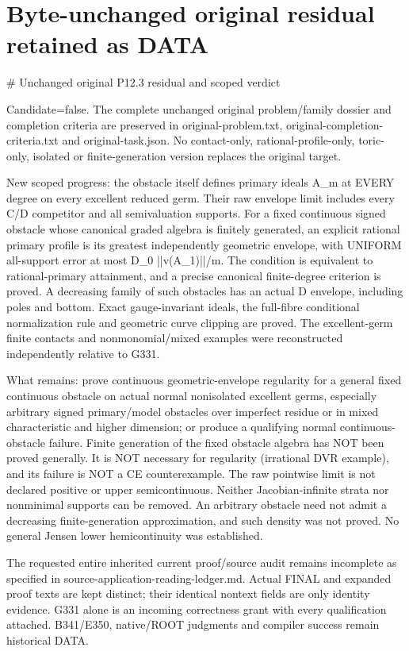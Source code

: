 \documentclass[11pt]{article}
\begin{document}
\section*{Byte-unchanged original residual retained as DATA}
\# Unchanged original P12.3 residual and scoped verdict

Candidate=false. The complete unchanged original problem/family dossier and completion criteria are preserved in original-problem.txt, original-completion-criteria.txt and original-task.json. No contact-only, rational-profile-only, toric-only, isolated or finite-generation version replaces the original target.

New scoped progress: the obstacle itself defines primary ideals A\_m at EVERY degree on every excellent reduced germ. Their raw envelope limit includes every C/D competitor and all semivaluation supports. For a fixed continuous signed obstacle whose canonical graded algebra is finitely generated, an explicit rational primary profile is its greatest independently geometric envelope, with UNIFORM all-support error at most D\_0 ||v(A\_1)||/m. The condition is equivalent to rational-primary attainment, and a precise canonical finite-degree criterion is proved. A decreasing family of such obstacles has an actual D envelope, including poles and bottom. Exact gauge-invariant ideals, the full-fibre conditional normalization rule and geometric curve clipping are proved. The excellent-germ finite contacts and nonmonomial/mixed examples were reconstructed independently relative to G331.

What remains: prove continuous geometric-envelope regularity for a general fixed continuous obstacle on actual normal nonisolated excellent germs, especially arbitrary signed primary/model obstacles over imperfect residue or in mixed characteristic and higher dimension; or produce a qualifying normal continuous-obstacle failure. Finite generation of the fixed obstacle algebra has NOT been proved generally. It is NOT necessary for regularity (irrational DVR example), and its failure is NOT a CE counterexample. The raw pointwise limit is not declared positive or upper semicontinuous. Neither Jacobian-infinite strata nor nonminimal supports can be removed. An arbitrary obstacle need not admit a decreasing finite-generation approximation, and such density was not proved. No general Jensen lower hemicontinuity was established.

The requested entire inherited current proof/source audit remains incomplete as specified in source-application-reading-ledger.md. Actual FINAL and expanded proof texts are kept distinct; their identical nontext fields are only identity evidence. G331 alone is an incoming correctness grant with every qualification attached. B341/E350, native/ROOT judgments and compiler success remain historical DATA.
\end{document}
